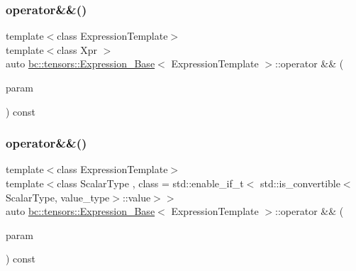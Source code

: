 \subsubsection{\texorpdfstring{operator\&\&()}{operator\&\&()}\hspace{0.1cm}{\footnotesize\ttfamily [1/2]}}
{\footnotesize\ttfamily template$<$class Expression\+Template$>$ \\
template$<$class Xpr $>$ \\
auto \hyperlink{classbc_1_1tensors_1_1Expression__Base}{bc\+::tensors\+::\+Expression\+\_\+\+Base}$<$ Expression\+Template $>$\+::operator \&\& (\begin{DoxyParamCaption}\item[{const \hyperlink{classbc_1_1tensors_1_1Expression__Base}{Expression\+\_\+\+Base}$<$ Xpr $>$ \&}]{param }\end{DoxyParamCaption}) const\hspace{0.3cm}{\ttfamily [inline]}}

\mbox{\label{classbc_1_1tensors_1_1Expression__Base_ace1c4e866356e784b42e4db76dd1cb04}} 
\subsubsection{\texorpdfstring{operator\&\&()}{operator\&\&()}\hspace{0.1cm}{\footnotesize\ttfamily [2/2]}}
{\footnotesize\ttfamily template$<$class Expression\+Template$>$ \\
template$<$class Scalar\+Type , class  = std\+::enable\+\_\+if\+\_\+t$<$   std\+::is\+\_\+convertible$<$\+Scalar\+Type, value\+\_\+type$>$\+::value$>$$>$ \\
auto \hyperlink{classbc_1_1tensors_1_1Expression__Base}{bc\+::tensors\+::\+Expression\+\_\+\+Base}$<$ Expression\+Template $>$\+::operator \&\& (\begin{DoxyParamCaption}\item[{const Scalar\+Type \&}]{param }\end{DoxyParamCaption}) const\hspace{0.3cm}{\ttfamily [inline]}}

\mbox{\label{classbc_1_1tensors_1_1Expression__Base_a3dc58dc46cbf3ab826af02f801a4a6d6}} 
